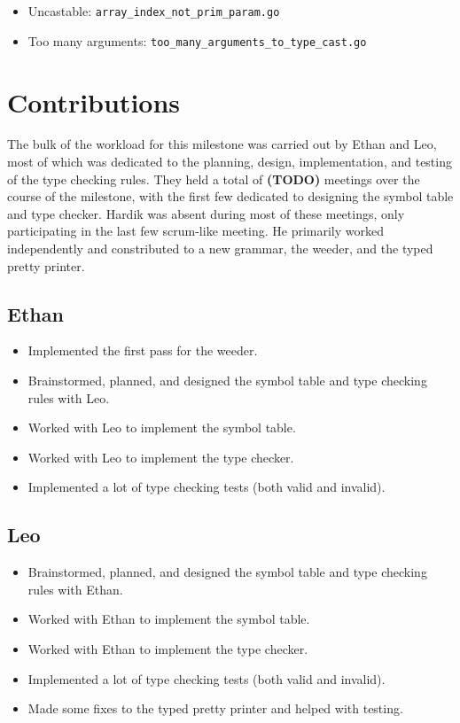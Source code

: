 \documentclass{article}
\begin{document}
\begin{itemize}
\item Uncastable: \texttt{array\_index\_not\_prim\_param.go}
\item Too many arguments: \texttt{too\_many\_arguments\_to\_type\_cast.go}
\end{itemize}

\section{Contributions}

The bulk of the workload for this milestone was carried out by Ethan and Leo, most of which was dedicated to the planning, design, implementation, and testing of the type checking rules.
They held a total of \textbf{(TODO)} meetings over the course of the milestone, with the first few dedicated to designing the symbol table and type checker.
Hardik was absent during most of these meetings, only participating in the last few scrum-like meeting.
He primarily worked independently and constributed to a new grammar, the weeder, and the typed pretty printer.

\subsection*{Ethan}

\begin{itemize}
    \item Implemented the first pass for the weeder.
    \item Brainstormed, planned, and designed the symbol table and type checking rules with Leo.
    \item Worked with Leo to implement the symbol table.
    \item Worked with Leo to implement the type checker.
    \item Implemented a lot of type checking tests (both valid and invalid).
\end{itemize}

\subsection*{Leo}

\begin{itemize}
    \item Brainstormed, planned, and designed the symbol table and type checking rules with Ethan.
    \item Worked with Ethan to implement the symbol table.
    \item Worked with Ethan to implement the type checker.
    \item Implemented a lot of type checking tests (both valid and invalid).
    \item Made some fixes to the typed pretty printer and helped with testing.
\end{itemize}
\end{document}

